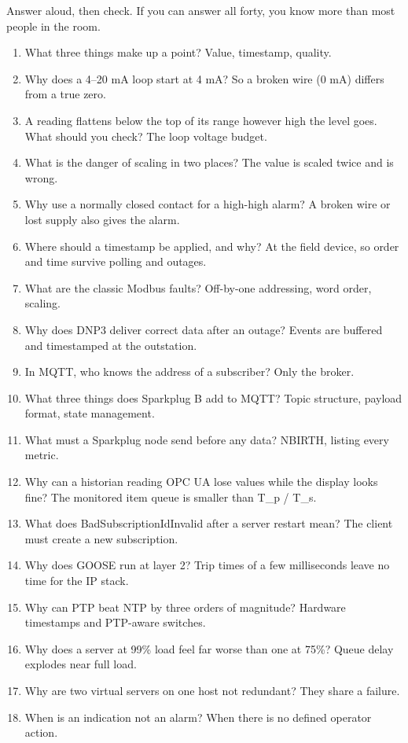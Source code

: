Answer aloud, then check. If you can answer all forty, you know more than most people in the room.
\begin{enumerate}
\item What three things make up a point? Value, timestamp, quality.
\item Why does a 4–20 mA loop start at 4 mA? So a broken wire (0 mA) differs from a true zero.
\item A reading flattens below the top of its range however high the level goes. What should you check? The loop voltage budget.
\item What is the danger of scaling in two places? The value is scaled twice and is wrong.
\item Why use a normally closed contact for a high-high alarm? A broken wire or lost supply also gives the alarm.
\item Where should a timestamp be applied, and why? At the field device, so order and time survive polling and outages.
\item What are the classic Modbus faults? Off-by-one addressing, word order, scaling.
\item Why does DNP3 deliver correct data after an outage? Events are buffered and timestamped at the outstation.
\item In MQTT, who knows the address of a subscriber? Only the broker.
\item What three things does Sparkplug B add to MQTT? Topic structure, payload format, state management.
\item What must a Sparkplug node send before any data? NBIRTH, listing every metric.
\item Why can a historian reading OPC UA lose values while the display looks fine? The monitored item queue is smaller than T\_p / T\_s.
\item What does BadSubscriptionIdInvalid after a server restart mean? The client must create a new subscription.
\item Why does GOOSE run at layer 2? Trip times of a few milliseconds leave no time for the IP stack.
\item Why can PTP beat NTP by three orders of magnitude? Hardware timestamps and PTP-aware switches.
\item Why does a server at 99\% load feel far worse than one at 75\%? Queue delay explodes near full load.
\item Why are two virtual servers on one host not redundant? They share a failure.
\item When is an indication not an alarm? When there is no defined operator action.

\end{enumerate}
